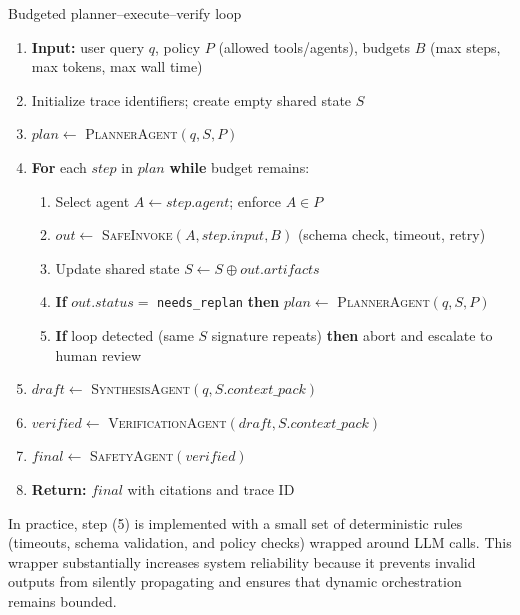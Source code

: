 \begin{llmalgobox}{Budgeted planner--execute--verify loop}
\label{alg:ch09_budgeted_orchestration}
\small
\begin{enumerate}[leftmargin=1.4em, itemsep=2pt]
  \item \textbf{Input:} user query $q$, policy $P$ (allowed tools/agents), budgets $B$ (max steps, max tokens, max wall time)
  \item Initialize trace identifiers; create empty shared state $S$
  \item $plan \leftarrow$ \textsc{PlannerAgent}$(q, S, P)$
  \item \textbf{For} each $step$ in $plan$ \textbf{while} budget remains:
    \begin{enumerate}[leftmargin=1.2em, itemsep=1pt]
      \item Select agent $A \leftarrow step.agent$; enforce $A \in P$
      \item $out \leftarrow$ \textsc{SafeInvoke}$(A, step.input, B)$ \hfill (schema check, timeout, retry)
      \item Update shared state $S \leftarrow S \oplus out.artifacts$
      \item \textbf{If} $out.status =$ \texttt{needs\_replan} \textbf{then} $plan \leftarrow$ \textsc{PlannerAgent}$(q, S, P)$
      \item \textbf{If} loop detected (same $S$ signature repeats) \textbf{then} abort and escalate to human review
    \end{enumerate}
  \item $draft \leftarrow$ \textsc{SynthesisAgent}$(q, S.context\_pack)$
  \item $verified \leftarrow$ \textsc{VerificationAgent}$(draft, S.context\_pack)$
  \item $final \leftarrow$ \textsc{SafetyAgent}$(verified)$
  \item \textbf{Return:} $final$ with citations and trace ID
\end{enumerate}
\end{llmalgobox}

\noindent In practice, step (5) is implemented with a small set of deterministic rules (timeouts, schema validation, and policy checks) wrapped around LLM calls.
This wrapper substantially increases system reliability because it prevents invalid outputs from silently propagating and ensures that dynamic orchestration remains bounded.

